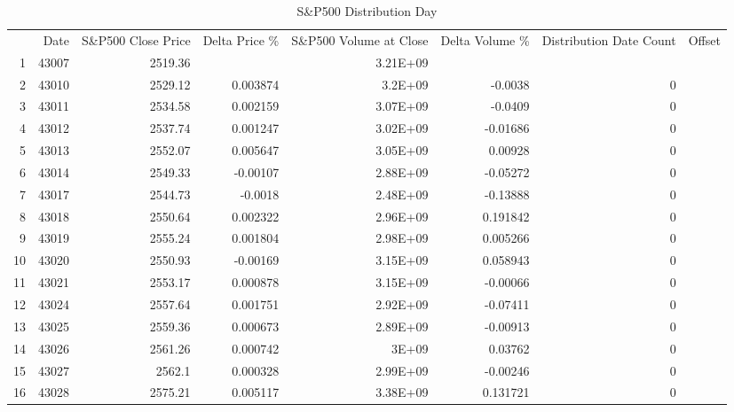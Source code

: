\documentclass{article}
\begin{document}
\begin{table}[htbp]
  \caption{S\&P500 Distribution Day}
    \begin{tabular}{rrrrrlrr}
          & \multicolumn{1}{p{4.215em}}{Date} & \multicolumn{1}{p{4.215em}}{S\&P500 Close Price} & \multicolumn{1}{p{4.215em}}{Delta Price \%} & \multicolumn{1}{p{4.215em}}{S\&P500 Volume at Close} & \multicolumn{1}{p{4.215em}}{Delta Volume \%} & \multicolumn{1}{p{4.215em}}{Distribution Date Count} & \multicolumn{1}{l}{Offset} \\
    1     & 43007 & 2519.36 &       & 3.21E+09 &       &       &  \\
    2     & 43010 & 2529.12 & 0.003874 & 3.2E+09 & \multicolumn{1}{r}{-0.0038} & 0     &  \\
    3     & 43011 & 2534.58 & 0.002159 & 3.07E+09 & \multicolumn{1}{r}{-0.0409} & 0     &  \\
    4     & 43012 & 2537.74 & 0.001247 & 3.02E+09 & \multicolumn{1}{r}{-0.01686} & 0     &  \\
    5     & 43013 & 2552.07 & 0.005647 & 3.05E+09 & \multicolumn{1}{r}{0.00928} & 0     &  \\
    6     & 43014 & 2549.33 & -0.00107 & 2.88E+09 & \multicolumn{1}{r}{-0.05272} & 0     &  \\
    7     & 43017 & 2544.73 & -0.0018 & 2.48E+09 & \multicolumn{1}{r}{-0.13888} & 0     &  \\
    8     & 43018 & 2550.64 & 0.002322 & 2.96E+09 & \multicolumn{1}{r}{0.191842} & 0     &  \\
    9     & 43019 & 2555.24 & 0.001804 & 2.98E+09 & \multicolumn{1}{r}{0.005266} & 0     &  \\
    10    & 43020 & 2550.93 & -0.00169 & 3.15E+09 & \multicolumn{1}{r}{0.058943} & 0     &  \\
    11    & 43021 & 2553.17 & 0.000878 & 3.15E+09 & \multicolumn{1}{r}{-0.00066} & 0     &  \\
    12    & 43024 & 2557.64 & 0.001751 & 2.92E+09 & \multicolumn{1}{r}{-0.07411} & 0     &  \\
    13    & 43025 & 2559.36 & 0.000673 & 2.89E+09 & \multicolumn{1}{r}{-0.00913} & 0     &  \\
    14    & 43026 & 2561.26 & 0.000742 & 3E+09 & \multicolumn{1}{r}{0.03762} & 0     &  \\
    15    & 43027 & 2562.1 & 0.000328 & 2.99E+09 & \multicolumn{1}{r}{-0.00246} & 0     &  \\
    16    & 43028 & 2575.21 & 0.005117 & 3.38E+09 & \multicolumn{1}{r}{0.131721} & 0     &  \\

\end{tabular}
\end{table}
\end{document}
